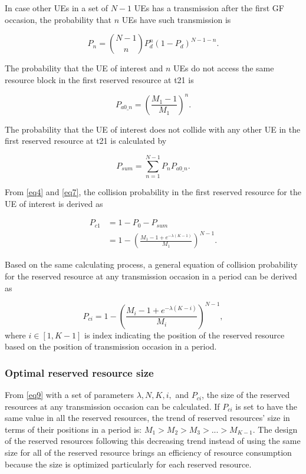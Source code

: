 \documentclass{ieeeaccess}
\begin{document}
In case other UEs in a set of $N-1$ UEs has a transmission after the first GF occasion, the probability that $n$  UEs have such transmission is 

\begin{equation}
P_{n} = \binom {N-1}{n}P_{d}^{n}(1-P_{d})^{N-1-n}.\label{eq5}
\end{equation}

The probability that the UE of interest and $n$ UEs do not access the same resource block in the first reserved resource at t21 is 

\begin{equation}
P_{a0\_n} = (\frac {M_{1}-1}{M_{1}})^{n}.\label{eq6}
\end{equation}

The probability that the UE of interest does not collide with any other UE in the first reserved resource at t21 is calculated by 

\begin{equation}
P_{sum} = \sum_{n=1}^{N-1} P_{n}P_{a0\_n}.\label{eq7}
\end{equation}

From \eqref{eq4} and \eqref{eq7}, the collision probability in the first reserved resource for the UE of interest is derived as 

\begin{align}
P_{c1} &= 1 - P_{0} - P_{sum} \nonumber\\
 &= 1 - (\frac{M_{1}-1+e^{-\lambda(K-1)}}{M_{1}})^{N-1}.\label{eq8}
\end{align}

Based on the same calculating process, a general equation of collision probability for the reserved resource at any transmission occasion in a period can be derived as 

\begin{equation}
P_{ci} = 1 - (\frac{M_{i}-1+e^{-\lambda(K-i)}}{M_{i}})^{N-1},\label{eq9}
\end{equation}
where
$i \in [1, K-1]$ is index indicating the position of the reserved resource based on the position of transmission occasion in a period.

\subsubsection{Optimal reserved resource size}

From \eqref{eq9} with a set of parameters  $\lambda, N, K, i,$ and $P_{ci}$, the size of the reserved resources at any transmission occasion can be calculated. If $P_{ci}$ is set to have the same value in all the reserved resources, the trend of reserved resources' size in terms of their positions in a period is: $M_1 > M_2 > M_3 > ... > M_{K-1}$. The design of the reserved resources following this decreasing trend instead of using the same size for all of the reserved resource brings an efficiency of resource consumption because the size is optimized particularly for each reserved resource.
\end{document}
